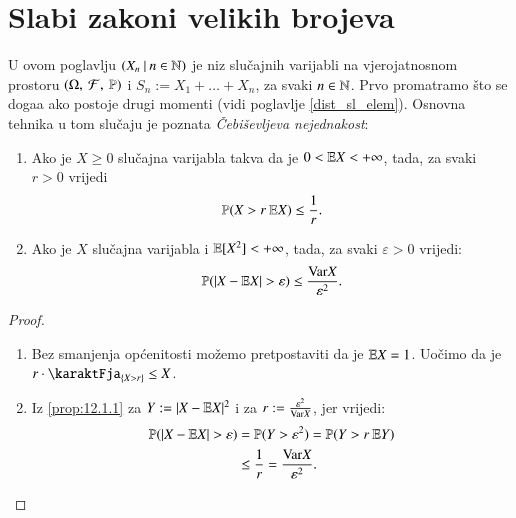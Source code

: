 
\chapter{Slabi zakoni velikih brojeva}

U ovom poglavlju $({X_n} \: | \: {n \in \mathbb{N}})$ je niz slu\v cajnih varijabli na vjerojatnosnom prostoru $(\Omega, \: \mathcal{F}, \: \mathbb{P})$ i $S_n := X_1 + \ldots + X_n$, za svaki $n \in \mathbb{N}$.
Prvo promatramo \v sto se doga\dj a ako postoje drugi momenti (vidi poglavlje \ref{dist_sl_elem}).
Osnovna tehnika u tom slu\v caju je poznata \emph{\v Cebi\v sevljeva nejednakost}:

\begin{prop}    \label{prop:12.1}
    \quad
    \begin{enumerate}[label=(\roman*)]
        \item   \label{prop:12.1.1}
        Ako je $X \geq 0$ slu\v cajna varijabla takva da je $0 < \mathbb{E} X < +\infty$, tada, za svaki $r > 0$ vrijedi
        \begin{equation*}
            \mathbb{P}({X > r \: \mathbb{E} X}) \leq \frac{1}{r}.
        \end{equation*}
        \item   \label{prop:12.1.2}
        Ako je $X$ slu\v cajna varijabla i $\mathbb{E} [X^2] < +\infty$, tada, za svaki $\varepsilon > 0$ vrijedi:
        \begin{equation*}
            \mathbb{P}({|X - \mathbb{E} X| > \varepsilon}) \leq \frac{\mathrm{Var} X}{\varepsilon^2}.
        \end{equation*}
    \end{enumerate}
\end{prop}

\begin{proof}
    \quad
    \begin{enumerate}[label=(\roman*)]
        \item Bez smanjenja op\' cenitosti mo\v zemo pretpostaviti da je $\mathbb{E} X = 1$.
        Uo\v cimo da je $r \cdot \karaktFja_{\{X > r\}} \leq X$.
        \item Iz \ref{prop:12.1.1} za $Y:= |X - \mathbb{E} X|^2$ i za $r:= \frac{\varepsilon^2}{\mathrm{Var} X}$, jer vrijedi:
        \begin{equation*}
            \begin{aligned}
                \mathbb{P}({|X - \mathbb{E} X| > \varepsilon}) &= \mathbb{P}({Y > \varepsilon^2}) = \mathbb{P}({Y > r \: \mathbb{E} Y})\\
                & \leq \frac{1}{r} = \frac{\mathrm{Var} X}{\varepsilon^2}.
            \end{aligned}
        \end{equation*}
    \end{enumerate}
\end{proof}

